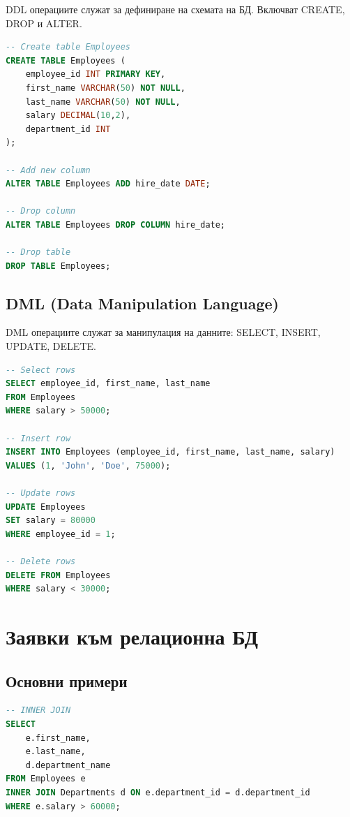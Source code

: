 \documentclass{scrartcl}
\begin{document}
\begin{FlushLeft}
DDL операциите служат за дефиниране на схемата на БД. Включват CREATE, DROP и ALTER.

\begin{lstlisting}[language=SQL, caption=DDL examples]
-- Create table Employees
CREATE TABLE Employees (
    employee_id INT PRIMARY KEY,
    first_name VARCHAR(50) NOT NULL,
    last_name VARCHAR(50) NOT NULL,
    salary DECIMAL(10,2),
    department_id INT
);

-- Add new column
ALTER TABLE Employees ADD hire_date DATE;

-- Drop column
ALTER TABLE Employees DROP COLUMN hire_date;

-- Drop table
DROP TABLE Employees;
\end{lstlisting}

\subsection{DML (Data Manipulation Language)}

DML операциите служат за манипулация на данните: SELECT, INSERT, UPDATE, DELETE.

\begin{lstlisting}[language=SQL, caption=DML examples]
-- Select rows
SELECT employee_id, first_name, last_name
FROM Employees
WHERE salary > 50000;

-- Insert row
INSERT INTO Employees (employee_id, first_name, last_name, salary)
VALUES (1, 'John', 'Doe', 75000);

-- Update rows
UPDATE Employees
SET salary = 80000
WHERE employee_id = 1;

-- Delete rows
DELETE FROM Employees
WHERE salary < 30000;
\end{lstlisting}

\section{Заявки към релационна БД}

\subsection{Основни примери}

\begin{lstlisting}[language=SQL, caption=SELECT with JOIN]
-- INNER JOIN
SELECT 
    e.first_name, 
    e.last_name, 
    d.department_name
FROM Employees e
INNER JOIN Departments d ON e.department_id = d.department_id
WHERE e.salary > 60000;


\end{lstlisting}
\end{FlushLeft}
\end{document}
